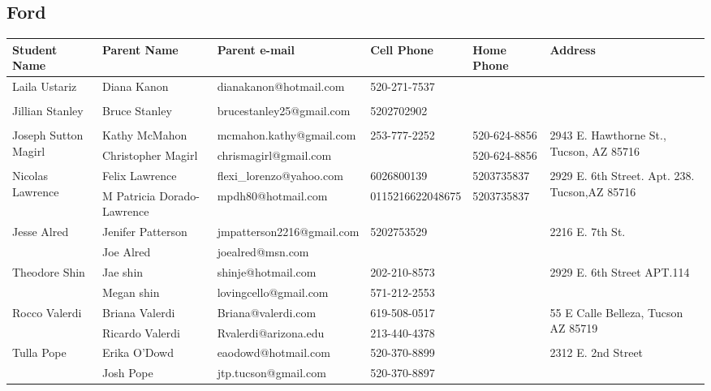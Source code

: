 \documentclass[landscape]{article}\usepackage[]{graphicx}\usepackage[]{color}
\begin{document}
\subsection{Ford}
\begin{longtable}{p{70pt}|p{75pt}|p{120pt}|p{60pt}|p{60pt}|p{120pt}|}
Student Name & Parent Name & Parent e-mail & Cell Phone & Home Phone & Address\\
\hline
\multirow{2}{70pt}{Laila Ustariz} & Diana Kanon & dianakanon@hotmail.com & 520-271-7537 &  & \multirow{2}{100pt}{} \\
 &  &  &  &  & \\
\hline
\multirow{2}{70pt}{Jillian Stanley} & Bruce Stanley & brucestanley25@gmail.com & 5202702902 &  & \multirow{2}{100pt}{} \\
 &  &  &  &  & \\
\hline
\multirow{2}{70pt}{Joseph Sutton Magirl} & Kathy McMahon & mcmahon.kathy@gmail.com & 253-777-2252 & 520-624-8856 & \multirow{2}{100pt}{2943 E. Hawthorne St., Tucson, AZ 85716} \\
 & Christopher Magirl & chrismagirl@gmail.com &  & 520-624-8856 & \\
\hline
\multirow{2}{70pt}{Nicolas Lawrence} & Felix Lawrence & flexi\_lorenzo@yahoo.com & 6026800139 & 5203735837 & \multirow{2}{100pt}{2929 E. 6th Street. Apt. 238. Tucson,AZ 85716} \\
 & M Patricia Dorado-Lawrence & mpdh80@hotmail.com & 0115216622048675 & 5203735837 & \\
\hline
\multirow{2}{70pt}{Jesse Alred} & Jenifer Patterson & jmpatterson2216@gmail.com & 5202753529 &  & \multirow{2}{100pt}{2216 E. 7th St.} \\
 & Joe Alred & joealred@msn.com &  &  & \\
\hline
\multirow{2}{70pt}{Theodore Shin} & Jae shin & shinje@hotmail.com & 202-210-8573 &  & \multirow{2}{100pt}{2929 E. 6th Street APT.114} \\
 & Megan shin & lovingcello@gmail.com & 571-212-2553 &  & \\
\hline
\multirow{2}{70pt}{Rocco Valerdi } & Briana Valerdi & Briana@valerdi.com & 619-508-0517 &  & \multirow{2}{100pt}{55 E Calle Belleza, Tucson AZ 85719} \\
 & Ricardo Valerdi & Rvalerdi@arizona.edu & 213-440-4378 &  & \\
\hline
\multirow{2}{70pt}{Tulla Pope} & Erika O'Dowd & eaodowd@hotmail.com & 520-370-8899 &  & \multirow{2}{100pt}{2312 E. 2nd Street} \\
 & Josh Pope & jtp.tucson@gmail.com & 520-370-8897 &  & \\

\end{longtable}
\end{document}
